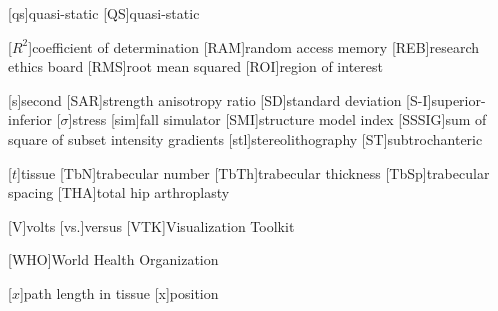 \begin{acronym}[HR-pQCT]
[qs]{quasi-static}
[QS]{quasi-static}

[$R^2$]{coefficient of determination}
[RAM]{random access memory}
[REB]{research ethics board}
[RMS]{root mean squared}
[ROI]{region of interest}

[s]{second}
[SAR]{strength anisotropy ratio}
[SD]{standard deviation}
[S-I]{superior-inferior}
[$\sigma$]{stress}
[sim]{fall simulator}
[SMI]{structure model index} 
[SSSIG]{sum of square of subset intensity gradients}
[stl]{stereolithography}
[ST]{sub\-tro\-chan\-teric}

[$t$]{tissue}
[TbN]{trabecular number}
[TbTh]{trabecular thickness}
[TbSp]{trabecular spacing}
[THA]{total hip arthroplasty}

[V]{volts}
[vs.]{versus}
[VTK]{Visualization Toolkit}

[WHO]{World Health Organization}

[$x$]{path length in tissue}
[x]{position}

\end{acronym}